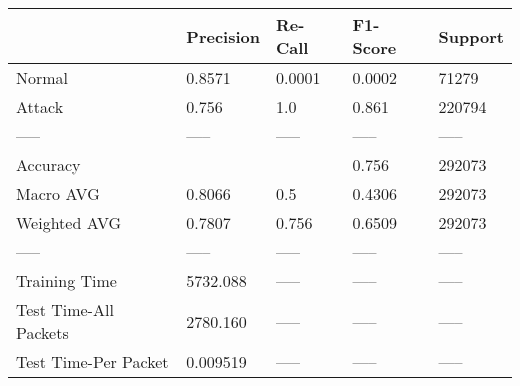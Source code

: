 \begin{tabular}{lllll}
\toprule
{} & Precision & Re-Call & F1-Score & Support \\
\midrule
Normal                &    0.8571 &  0.0001 &   0.0002 &   71279 \\
Attack                &     0.756 &     1.0 &    0.861 &  220794 \\
-----                 &     ----- &   ----- &    ----- &   ----- \\
Accuracy              &           &         &    0.756 &  292073 \\
Macro AVG             &    0.8066 &     0.5 &   0.4306 &  292073 \\
Weighted AVG          &    0.7807 &   0.756 &   0.6509 &  292073 \\
-----                 &     ----- &   ----- &    ----- &   ----- \\
Training Time         &  5732.088 &   ----- &    ----- &   ----- \\
Test Time-All Packets &  2780.160 &   ----- &    ----- &   ----- \\
Test Time-Per Packet  &  0.009519 &   ----- &    ----- &   ----- \\
\bottomrule
\end{tabular}
